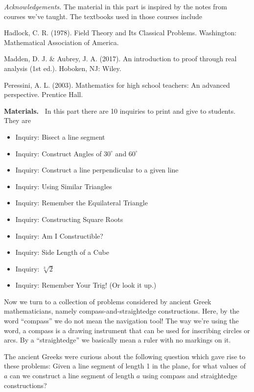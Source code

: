 \documentclass[11pt]{article}
\newenvironment{bignote}[1][Instructor note]%
	{\begin{mdframed}\raggedright{\bf #1.~}}
	{\end{mdframed}}
\theoremstyle{definition}
\begin{document}
{\it Acknowledgements.}  The material in this part is inspired by the notes from courses we've taught. The textbooks used in those courses include

Hadlock, C. R. (1978). Field Theory and Its Classical Problems. Washington: Mathematical Association of America.

Madden, D. J. \& Aubrey, J. A. (2017). An introduction to proof through real analysis (1st ed.). Hoboken, NJ: Wiley.

Peressini, A. L. (2003). Mathematics for high school teachers: An advanced perspective. Prentice Hall.

\begin{bignote}[Materials]
  In this part there are 10 inquiries to print and give to students. They are
\begin{itemize}
  \item Inquiry: Bisect a line segment
  \item Inquiry: Construct Angles of $30^\circ$ and $60^\circ$
  \item Inquiry: Construct a line perpendicular to a given line
  \item Inquiry: Using Similar Triangles
  \item Inquiry: Remember the Equilateral Triangle
  \item Inquiry: Constructing Square Roots
  \item Inquiry: Am I Constructible?
  \item Inquiry: Side Length of a Cube
  \item Inquiry: $\sqrt[3]{2}$
  \item Inquiry: Remember Your Trig! (Or look it up.)
\end{itemize}
\end{bignote}

Now we turn to a collection of problems considered by ancient Greek mathematicians, namely compass-and-straightedge constructions. 
Here, by the word ``compass'' we do not mean the navigation tool! The way we're using the word, a compass is a drawing instrument 
that can be used for inscribing circles or arcs. By a ``straightedge'' we basically mean a ruler with no markings on it. 

The ancient Greeks were curious about the following question which gave rise to these problems: Given a line segment of length 1 in the plane, 
for what values of $a$ can we construct a line segment of length $a$ using compass and straightedge constructions?
\end{document}
